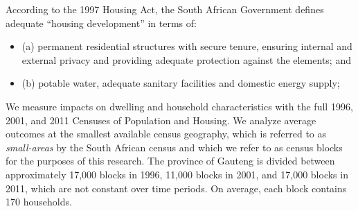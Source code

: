 \documentclass[12pt]{article}
\begin{document}
According to the 1997 Housing Act, the South African Government defines adequate ``housing development'' in terms of:

\begin{itemize}
\item (a) permanent residential structures with secure tenure, ensuring internal and external privacy and providing adequate protection against the elements; and
\item (b) potable water, adequate sanitary facilities and domestic energy supply;
\end{itemize}



We measure impacts on dwelling and household characteristics with the full 1996, 2001, and 2011 Censuses of Population and Housing. We analyze average outcomes at the smallest available census geography, which is referred to as {\it small-areas} by the South African census and which we refer to as census blocks for the purposes of this research.  The province of Gauteng is divided between approximately 17,000 blocks in 1996, 11,000 blocks in 2001, and 17,000 blocks in 2011, which are not constant over time periods.  On average, each block contains 170 households. 




\end{document}
